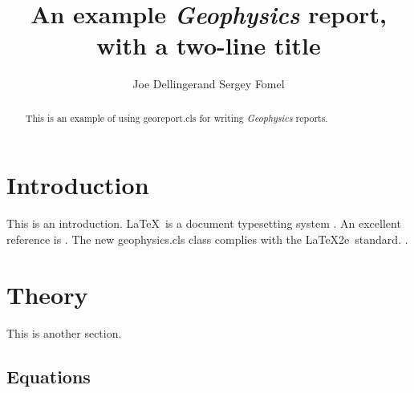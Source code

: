 \documentclass{georeport}
\begin{document}
\title{An example \emph{Geophysics} report, \\ with a two-line title}

\renewcommand{\thefootnote}{\fnsymbol{footnote}} 


\address{
\footnotemark[1]BP UTG, \\
200 Westlake Park Blvd, \\
Houston, TX, 77079 \\
\footnotemark[2]Bureau of Economic Geology, \\
John A. and Katherine G. Jackson School of Geosciences \\
The University of Texas at Austin \\
University Station, Box X \\
Austin, TX 78713-8924}
\author{Joe Dellinger\footnotemark[1] and Sergey Fomel\footnotemark[2]}


\maketitle

\begin{abstract}
  This is an example of using \textsf{georeport.cls} for writing
  \emph{Geophysics} reports.
\end{abstract}

\section{Introduction}

This is an introduction. \LaTeX\ is a  document
typesetting system \cite[]{lamport}. An excellent reference is
\cite[]{kopka}. The new \textsf{geophysics.cls} class complies with
the \LaTeX2e\ standard. .

\section*{Theory}

This is another section. 

\subsection{Equations}
\end{document}
